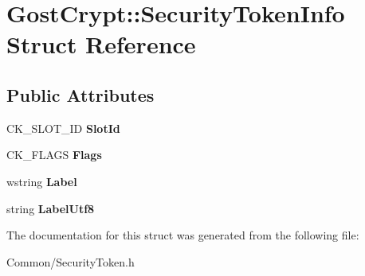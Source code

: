 \hypertarget{struct_gost_crypt_1_1_security_token_info}{}\section{Gost\+Crypt\+:\+:Security\+Token\+Info Struct Reference}
\label{struct_gost_crypt_1_1_security_token_info}
\subsection*{Public Attributes}
\begin{DoxyCompactItemize}
\item 
\mbox{\label{struct_gost_crypt_1_1_security_token_info_afb3d1a56f9fe3145682615d1743b1a89}} 
C\+K\+\_\+\+S\+L\+O\+T\+\_\+\+ID {\bfseries Slot\+Id}
\item 
\mbox{\label{struct_gost_crypt_1_1_security_token_info_a3230e57d31849e8e695f7838cbb9b165}} 
C\+K\+\_\+\+F\+L\+A\+GS {\bfseries Flags}
\item 
\mbox{\label{struct_gost_crypt_1_1_security_token_info_a626985da415eb9819fd9a6443dc33176}} 
wstring {\bfseries Label}
\item 
\mbox{\label{struct_gost_crypt_1_1_security_token_info_ad08d65cef1055fb7f48ef3640dc49282}} 
string {\bfseries Label\+Utf8}
\end{DoxyCompactItemize}


The documentation for this struct was generated from the following file\+:\begin{DoxyCompactItemize}
\item 
Common/Security\+Token.\+h\end{DoxyCompactItemize}
